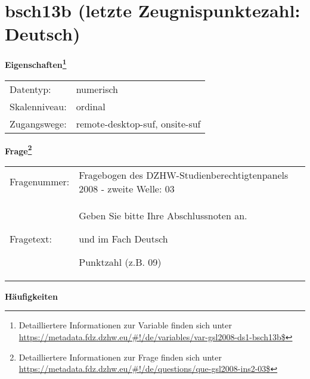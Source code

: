 
    \setcounter{footnote}{0}

    \vspace*{-1.8cm}
	\section{bsch13b (letzte Zeugnispunktezahl: Deutsch)}
	\label{section:bsch13b}



    \vspace*{0.5cm}
    \noindent\textbf{Eigenschaften\footnote{Detailliertere Informationen zur Variable finden sich unter
		\url{https://metadata.fdz.dzhw.eu/\#!/de/variables/var-gsl2008-ds1-bsch13b$}}}\\
	\begin{tabularx}{\hsize}{@{}lX}
	Datentyp: & numerisch \\
	Skalenniveau: & ordinal \\
	Zugangswege: &
	  remote-desktop-suf, 
	  onsite-suf
 \\
    \end{tabularx}



				\vspace*{0.5cm}
                \noindent\textbf{Frage\footnote{Detailliertere Informationen zur Frage finden sich unter
		              \url{https://metadata.fdz.dzhw.eu/\#!/de/questions/que-gsl2008-ins2-03$}}}\\
				\begin{tabularx}{\hsize}{@{}lX}
					Fragenummer: &
					  Fragebogen des DZHW-Studienberechtigtenpanels 2008 - zweite Welle:
					  03
 \\
					Fragetext: & Geben Sie bitte Ihre Abschlussnoten an.\par  und im Fach Deutsch\par  Punktzahl (z.B. 09) \\
				\end{tabularx}





        		\vspace*{0.5cm}
                \noindent\textbf{Häufigkeiten}

